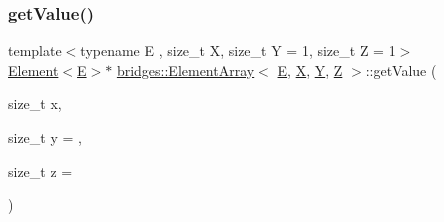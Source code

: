 \subsubsection{\texorpdfstring{getValue()}{getValue()}\hspace{0.1cm}{\footnotesize\ttfamily [1/2]}}
{\footnotesize\ttfamily template$<$typename E , size\+\_\+t X, size\+\_\+t Y = 1, size\+\_\+t Z = 1$>$ \\
\mbox{\hyperlink{classbridges_1_1_element}{Element}}$<$\mbox{\hyperlink{namespacebridges_acfb0a4f7877d8f63de3e6862004c50eda3a3ea00cfc35332cedf6e5e9a32e94da}{E}}$>$$\ast$ \mbox{\hyperlink{classbridges_1_1_element_array}{bridges\+::\+Element\+Array}}$<$ \mbox{\hyperlink{namespacebridges_acfb0a4f7877d8f63de3e6862004c50eda3a3ea00cfc35332cedf6e5e9a32e94da}{E}}, \mbox{\hyperlink{namespacebridges_acfb0a4f7877d8f63de3e6862004c50eda02129bb861061d1a052c592e2dc6b383}{X}}, \mbox{\hyperlink{namespacebridges_acfb0a4f7877d8f63de3e6862004c50eda57cec4137b614c87cb4e24a3d003a3e0}{Y}}, \mbox{\hyperlink{namespacebridges_acfb0a4f7877d8f63de3e6862004c50eda21c2e59531c8710156d34a3c30ac81d5}{Z}} $>$\+::get\+Value (\begin{DoxyParamCaption}\item[{size\+\_\+t}]{x,  }\item[{size\+\_\+t}]{y = {},  }\item[{size\+\_\+t}]{z = {} }\end{DoxyParamCaption})\hspace{0.3cm}{\ttfamily [inline]}}

\mbox{\label{classbridges_1_1_element_array_a9e15557584b74ac7909cac00a2ab4fbe}} 

